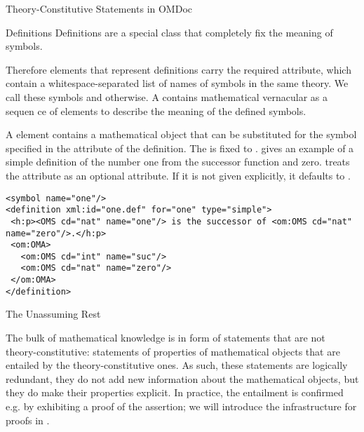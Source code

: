 \begin{omgroup}[short=Mathematical Statements,id=statements]
\begin{omgroup}[id=constitutive-statements]{Theory-Constitutive Statements in OMDoc}
\begin{module}[id=constitutive-statements]
\begin{omgroup}[id=definitions]{Definitions}
Definitions are a special class {} that completely fix the meaning of
symbols. 

\begin{definition}[id=definition.def]
  Therefore {} elements that represent definitions carry the required
  {} attribute, which contain a whitespace-separated list of
  names of symbols in the same theory.  We call these symbols
  {} and {}
  otherwise. A {} contains mathematical vernacular as a sequen ce of
  {} elements to describe the meaning of the defined symbols.

  A {} element contains a mathematical object that can be substituted
  for the symbol specified in the {} attribute of the
  definition. The {} is fixed to
  {}.  {}
  gives an example of a simple definition of the number one from the successor function
  and zero. {\omdoc} treats the {} attribute as an optional
  attribute. If it is not given explicitly, it defaults to
  {}.
\end{definition}

\begin{lstlisting}[label=lst:one,
  caption={A Simple {\omdoc} {\element{definition}}.},
  index={definition}]
<symbol name="one"/>
<definition xml:id="one.def" for="one" type="simple">
 <h:p><OMS cd="nat" name="one"/> is the successor of <om:OMS cd="nat" name="zero"/>.</h:p>
 <om:OMA>
   <om:OMS cd="int" name="suc"/>
   <om:OMS cd="nat" name="zero"/>
 </om:OMA>
</definition>
\end{lstlisting}
\end{omgroup}
\end{module}
\end{omgroup}

\begin{omgroup}[id=assertion]{The Unassuming Rest}
\begin{module}[id=non-constitutive-statements]

The bulk of mathematical knowledge is in form of statements that are not
theory-constitutive: statements of properties of mathematical objects that are entailed by
the theory-constitutive ones. As such, these statements are logically redundant, they do
not add new information about the mathematical objects, but they do make their properties
explicit. In practice, the entailment is confirmed e.g.  by exhibiting a proof of the
assertion; we will introduce the infrastructure for proofs in {}.


\end{module}
\end{omgroup}
\end{omgroup}
